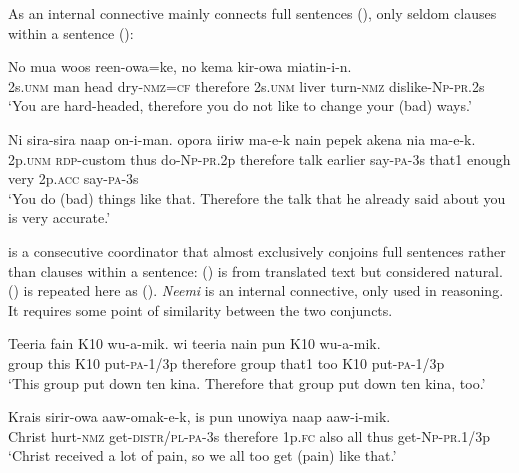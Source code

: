  
As an internal connective  mainly connects full sentences (), only seldom clauses within a sentence ():

\ea%
\label{ex:x1410}
\gll No  mua  woos  reen-owa=ke,    no  kema  kir-owa miatin-i-n.\\
2s.\textsc{unm} man  head  dry-\textsc{nmz}=\textsc{cf} therefore  2s.\textsc{unm} liver turn-\textsc{nmz} dislike-\textsc{Np}-\textsc{pr}.2s\\
\glt`You are hard-headed, therefore you do not like to change your (bad) ways.'
\z


\ea%
\label{ex:x1411}
\gll Ni  sira-sira  naap  on-i-man.    opora  iiriw ma-e-k  nain  pepek  akena  nia  ma-e-k.\\
2p.\textsc{unm} \textsc{rdp}-custom  thus  do-\textsc{Np}-\textsc{pr}.2p  therefore  talk  earlier say-\textsc{pa}-3s  that1  enough  very  2p.\textsc{acc} say-\textsc{pa}-3s\\
\glt`You do (bad) things like that. Therefore the talk that he already said about you is very accurate.'
\z


  is a consecutive coordinator that almost exclusively conjoins full sentences rather than clauses within a sentence: () is from translated text but considered natural. () is repeated here as (). \textit{Neemi} is an internal connective, only used in reasoning. It requires some point of similarity between the two conjuncts.

\ea%
\label{ex:x1904}
\gll Teeria  fain  K10  wu-a-mik.    wi  teeria  nain  pun K10  wu-a-mik.\\
group  this  K10  put-\textsc{pa}-1/3p  therefore  group  that1  too K10  put-\textsc{pa}-1/3p\\
\glt`This group put down ten kina. Therefore that group put down ten kina, too.'
\z
{}


\ea%
\label{ex:x1409}
\gll Krais  sirir-owa  aaw-omak-e-k,    is  pun unowiya  naap  aaw-i-mik.\\
Christ  hurt-\textsc{nmz} get-\textsc{distr}/\textsc{pl}-\textsc{pa}-3s  therefore  1p.\textsc{fc} also all  thus  get-\textsc{Np}-\textsc{pr}.1/3p\\
\glt`Christ received a lot of pain, so we all too get (pain) like that.'
\z


